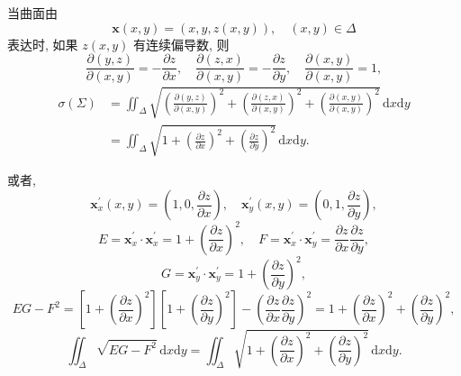 当曲面由
\[
  \boldsymbol{x}(x, y)=(x, y, z(x, y)), \quad(x, y) \in \Delta
\]
表达时, 如果 $z(x, y)$ 有连续偏导数, 则
\[
  \frac{\partial(y, z)}{\partial(x, y)}=-\frac{\partial z}{\partial x}, \quad \frac{\partial(z, x)}{\partial(x, y)}=-\frac{\partial z}{\partial y}, \quad \frac{\partial(x, y)}{\partial(x, y)}=1,
\]
\begin{align*}
  \sigma(\Sigma) &=\iint_{\Delta} \sqrt{\left(\frac{\partial(y, z)}{\partial(x, y)}\right)^{2}+\left(\frac{\partial(z, x)}{\partial(x, y)}\right)^{2}+\left(\frac{\partial(x, y)}{\partial(x, y)}\right)^{2}}\,\mathrm{d} x \mathrm{d} y \\
  &=\iint_{\Delta} \sqrt{1+\left(\frac{\partial z}{\partial x}\right)^{2}+\left(\frac{\partial z}{\partial y}\right)^{2}}\,\mathrm{d} x \mathrm{d} y.
\end{align*}

或者,
\[
  \boldsymbol{x}_{x}^{\prime}(x, y)=\left(1,0, \frac{\partial z}{\partial x}\right), \quad \boldsymbol{x}_{y}^{\prime}(x, y)=\left(0,1, \frac{\partial z}{\partial y}\right),
\]
\[
  E=\boldsymbol{x}_{x}^{\prime} \cdot \boldsymbol{x}_{x}^{\prime}=1+\left(\frac{\partial z}{\partial x}\right)^{2}, \quad F=\boldsymbol{x}_{x}^{\prime} \cdot \boldsymbol{x}_{y}^{\prime}=\frac{\partial z}{\partial x} \frac{\partial z}{\partial y},
\]
\[
  G=\boldsymbol{x}_{y}^{\prime} \cdot \boldsymbol{x}_{y}^{\prime}=1+\left(\frac{\partial z}{\partial y}\right)^{2},
\]
\[
  E G-F^{2}=\left[1+\left(\frac{\partial z}{\partial x}\right)^{2}\right]\left[1+\left(\frac{\partial z}{\partial y}\right)^{2}\right]-\left(\frac{\partial z}{\partial x} \frac{\partial z}{\partial y}\right)^{2}=1+\left(\frac{\partial z}{\partial x}\right)^{2}+\left(\frac{\partial z}{\partial y}\right)^{2},
\]
\[
  \iint_{\Delta} \sqrt{E G-F^{2}}\,\mathrm{d} x \mathrm{d} y=\iint_{\Delta} \sqrt{1+\left(\frac{\partial z}{\partial x}\right)^{2}+\left(\frac{\partial z}{\partial y}\right)^{2}}\,\mathrm{d} x \mathrm{d} y.
\]

